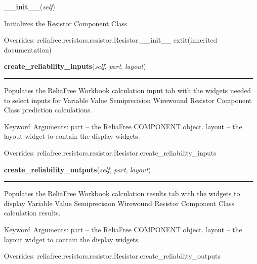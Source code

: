 \hspace{.8\funcindent}\begin{boxedminipage}{\funcwidth}

    \raggedright \textbf{\_\_init\_\_}(\textit{self})

\setlength{\parskip}{2ex}
    Initializes the Resistor Component Class.

\setlength{\parskip}{1ex}
      Overrides: reliafree.resistors.resistor.Resistor.\_\_init\_\_ 	extit{(inherited documentation)}

    \end{boxedminipage}

    \vspace{0.5ex}

\hspace{.8\funcindent}\begin{boxedminipage}{\funcwidth}

    \raggedright \textbf{create\_reliability\_inputs}(\textit{self}, \textit{part}, \textit{layout})

    \vspace{-1.5ex}

    \rule{\textwidth}{0.5\fboxrule}
\setlength{\parskip}{2ex}
    Populates the ReliaFree Workbook calculation input tab with the widgets
    needed to select inputs for Variable Value Semiprecision Wirewound 
    Resistor Component Class prediction calculations.

    Keyword Arguments: part   -- the ReliaFree COMPONENT object. layout -- 
    the layout widget to contain the display widgets.

\setlength{\parskip}{1ex}
      Overrides: reliafree.resistors.resistor.Resistor.create\_reliability\_inputs

    \end{boxedminipage}

    \vspace{0.5ex}

\hspace{.8\funcindent}\begin{boxedminipage}{\funcwidth}

    \raggedright \textbf{create\_reliability\_outputs}(\textit{self}, \textit{part}, \textit{layout})

    \vspace{-1.5ex}

    \rule{\textwidth}{0.5\fboxrule}
\setlength{\parskip}{2ex}
    Populates the ReliaFree Workbook calculation results tab with the 
    widgets to display Variable Value Semiprecision Wirewound Resistor 
    Component Class calculation results.

    Keyword Arguments: part   -- the ReliaFree COMPONENT object. layout -- 
    the layout widget to contain the display widgets.

\setlength{\parskip}{1ex}
      Overrides: reliafree.resistors.resistor.Resistor.create\_reliability\_outputs

    \end{boxedminipage}

